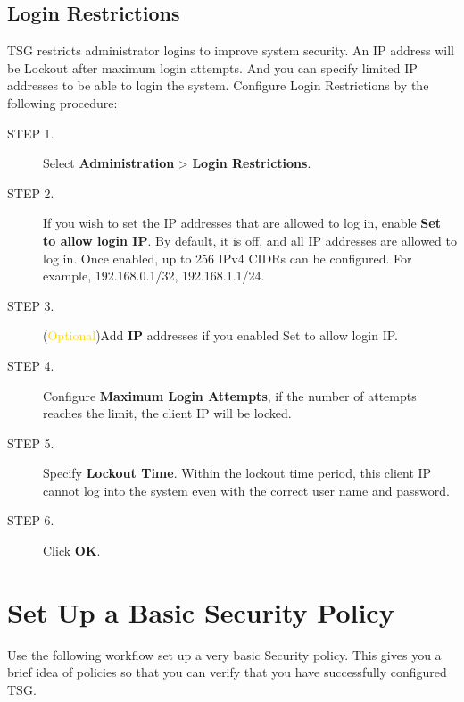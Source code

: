 \subsection*{\hypertarget{link:Login Restrictions}{Login Restrictions}}
\label{sec:intro:logging:restrictions}

TSG restricts administrator logins to improve system security. An IP address will be Lockout after maximum login attempts. 
And you can specify limited IP addresses to be able to login the system. Configure Login Restrictions by the following procedure: 


\begin{description}
    \item[STEP 1.]Select \textbf{Administration} > \textbf{Login Restrictions}.
    \item[STEP 2.]If you wish to set the IP addresses that are allowed to log in, enable \textbf{Set to allow login IP}. By default, it is off, and all IP addresses are allowed to log in. 
    Once enabled, up to 256 IPv4 CIDRs can be configured. For example, 192.168.0.1/32, 192.168.1.1/24.
    \item[STEP 3.](\textcolor{gold}{Optional})Add \textbf{IP} addresses if you enabled Set to allow login IP.
    \item[STEP 4.]Configure \textbf{Maximum Login Attempts}, if the number of attempts reaches the limit, the client IP will be locked. 
    \item[STEP 5.]Specify \textbf{Lockout Time}. Within the lockout time period, this client IP cannot log into the system even with the correct user name and password.
    \item[STEP 6.]Click \textbf{OK}.
\end{description}

\section*{\hypertarget{link:Set Up a Basic Security Policy}{Set Up a Basic Security Policy}}
\label{sec:intro:security}

Use the following workflow set up a very basic Security policy. This gives you a brief idea of policies so that you can verify that you have successfully configured TSG.

